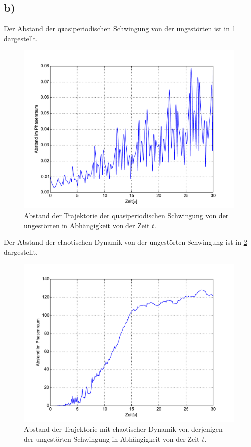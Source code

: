 \subsection*{b)}
Der Abstand der quasiperiodischen Schwingung von der ungestörten ist in \cref{fig:abstand1} dargestellt.
\begin{figure}[H]
	\includegraphics[width = \textwidth]{../Plots/Plot_2_B_1.pdf}
	\caption{Abstand der Trajektorie der quasiperiodischen Schwingung von der ungestörten in Abhängigkeit von der Zeit $t$.\label{fig:abstand1}}
\end{figure}
Der Abstand der chaotischen Dynamik von der ungestörten Schwingung ist in \cref{fig:abstand2} dargestellt.
\begin{figure}[H]
	\includegraphics[width = \textwidth]{../Plots/Plot_2_B_2.pdf}
	\caption{Abstand der Trajektorie mit chaotischer Dynamik von derjenigen der ungestörten Schwingung in Abhängigkeit von der Zeit $t$.\label{fig:abstand2}}
\end{figure}
